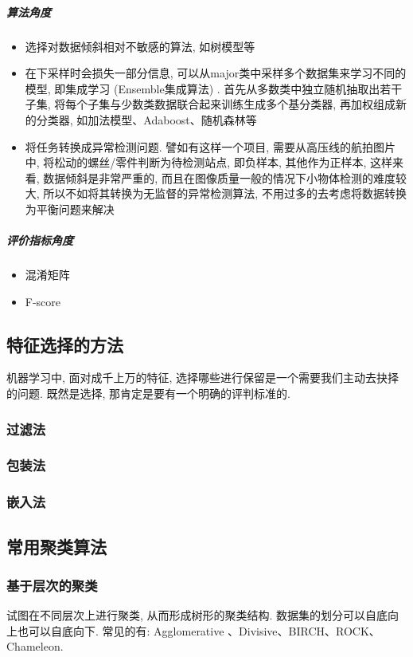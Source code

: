 \subparagraph{算法角度}
\begin{itemize}
	\item 选择对数据倾斜相对不敏感的算法, 如树模型等
	\item 在下采样时会损失一部分信息, 可以从major类中采样多个数据集来学习不同的模型, 即集成学习 (Ensemble集成算法) . 首先从多数类中独立随机抽取出若干子集, 将每个子集与少数类数据联合起来训练生成多个基分类器, 再加权组成新的分类器, 如加法模型、Adaboost、随机森林等
	\item 将任务转换成异常检测问题. 譬如有这样一个项目, 需要从高压线的航拍图片中, 将松动的螺丝/零件判断为待检测站点, 即负样本, 其他作为正样本, 这样来看, 数据倾斜是非常严重的, 而且在图像质量一般的情况下小物体检测的难度较大, 所以不如将其转换为无监督的异常检测算法, 不用过多的去考虑将数据转换为平衡问题来解决
\end{itemize}

\subparagraph{评价指标角度}
\begin{itemize}
	\item 混淆矩阵
	\item F-score
\end{itemize}

\subsection{特征选择的方法}
机器学习中, 面对成千上万的特征, 选择哪些进行保留是一个需要我们主动去抉择的问题. 既然是选择, 那肯定是要有一个明确的评判标准的. 

\subsubsection{过滤法}


\subsubsection{包装法}

\subsubsection{嵌入法}

\subsection{常用聚类算法}

\subsubsection{基于层次的聚类}
试图在不同层次上进行聚类, 从而形成树形的聚类结构. 数据集的划分可以自底向上也可以自底向下. 常见的有: Agglomerative 、Divisive、BIRCH、ROCK、Chameleon. 

